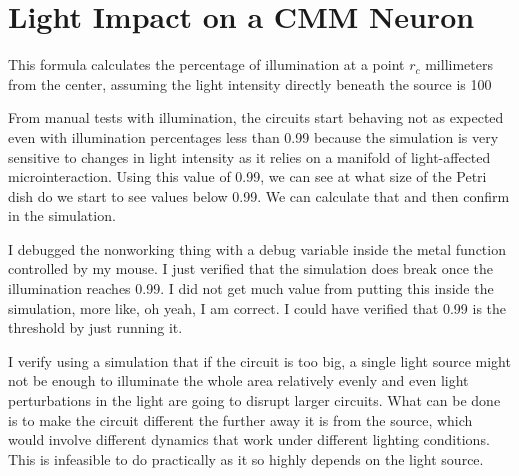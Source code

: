 \section{Light Impact on a CMM Neuron \citep{stovold2017reaction}} \label{sec:light-impact-cmm-neuron}
This formula calculates the percentage of illumination at a point \( r_c \) millimeters from the center, assuming the light intensity directly beneath the source is 100%


From manual tests with illumination, the circuits start behaving not as expected even with illumination percentages less than 0.99 because the simulation is very sensitive to changes in light intensity as it relies on a manifold of light-affected microinteraction. Using this value of 0.99, we can see at what size of the Petri dish do we start to see values below 0.99. We can calculate that and then confirm in the simulation. 


I debugged the nonworking thing with a debug variable inside the metal function controlled by my mouse. 
I just verified that the simulation does break once the illumination reaches 0.99. I did not get much value from putting this inside the simulation, more like, oh yeah, I am correct.
I could have verified that 0.99 is the threshold by just running 
it.

I verify using a simulation that if the circuit is too big, a single light source might not be enough to illuminate the whole area relatively evenly and even light perturbations in the light are going to disrupt larger circuits. 
What can be done is to make the circuit different the further away it is from the source, which would involve different dynamics that work under different lighting conditions. This is infeasible to do practically as it so highly depends on the light source. 

